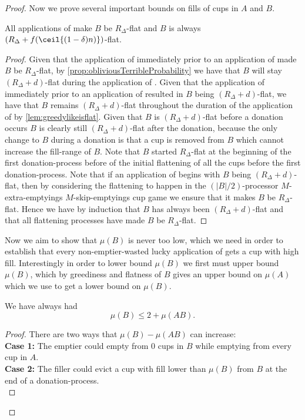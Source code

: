 \begin{proof}
Now we prove several important bounds on fills of cups in $A$ and $B$.
\begin{clm}
  \label{clm:allflatteningsworkbyM}
  All applications of \flatalg make $B$ be $R_\Delta$-flat and
  $B$ is always $(R_\Delta + f(\ceil{(1-\delta)n)})$-flat.
\end{clm}
\begin{proof}
  Given that the application of \flatalg immediately prior to an application
  of \randalg made $B$ be $R_\Delta$-flat, by
  \cref{prop:obliviousTerribleProbability} we have that $B$ will
  stay $(R_\Delta + d)$-flat during the application of \randalg. 
  Given that the application of \randalg immediately prior to an
  application of \flatalg resulted in $B$ being $(R_\Delta
  + d)$-flat, we have that $B$ remains $(R_\Delta + d)$-flat
  throughout the duration of the application of \flatalg by
  \cref{lem:greedylikeisflat}. Given that $B$ is $(R_\Delta +
  d)$-flat before a donation occurs $B$ is clearly still $(R_\Delta +
  d)$-flat after the donation, because the only change to $B$ during
  a donation is that a cup is removed from $B$ which cannot increase
  the fill-range of $B$.
  Note that $B$ started $R_\Delta$-flat at the beginning of the
  first donation-process before of the initial flattening of all
  the cups before the first donation-process.
  Note that if an application of \flatalg begins with $B$ being
  $(R_\Delta + d)$-flat, then by considering the flattening to
  happen in the $(|B|/2)$-processor $M$-extra-emptyings
  $M$-skip-emptyings cup game we ensure that it makes $B$ be
  $R_\Delta$-flat.
  Hence we have by induction that $B$ has always been $(R_\Delta
  + d)$-flat and that all flattening processes have made $B$ be
  $R_\Delta$-flat. 
\end{proof}

Now we aim to show that $\mu(B)$ is never too low, which we need
in order to establish that every non-emptier-wasted lucky
application of \randalg gets a cup with high fill. Interestingly
in order to lower bound $\mu(B)$ we first must upper bound
$\mu(B)$, which by greediness and flatness of $B$ gives an upper
bound on $\mu(A)$ which we use to get a lower bound on $\mu(B)$.

\begin{clm}
  \label{clm:muBdoesntgettoobig}
  We have always had
  $$\mu(B) \le 2 + \mu(A B).$$
\end{clm}
\begin{proof}
  There are two ways that $\mu(B)-\mu(A B)$ can increase: \\
  \textbf{Case 1:}
  The emptier could empty from $0$ cups in $B$ while emptying
  from every cup in $A$. \\
  \textbf{Case 2:}
  The filler could evict a cup with fill lower than $\mu(B)$ from
  $B$ at the end of a donation-process. \\


\end{proof}
\end{proof}
